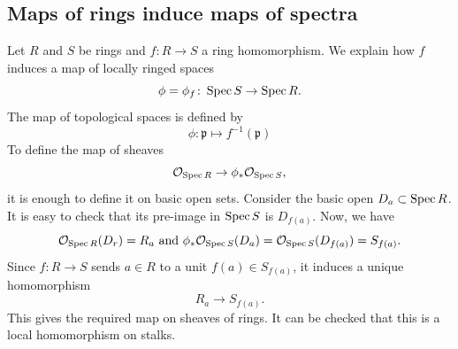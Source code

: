 \subsection{Maps of rings induce maps of spectra}
Let \(R\) and \(S\) be rings and \(f \colon R \to S\) a ring homomorphism.
We explain how \(f\) induces a map of locally ringed spaces
\[ \phi = \phi_{f} \colon \operatorname{Spec} S \to \operatorname{Spec} R.\] 
The map of topological spaces is defined by
\begin{equation}
 \phi \colon \mathfrak{p} \mapsto f^{-1}(\mathfrak{p})
\end{equation}
To define the map of sheaves
\[ \mathcal{O}_{\operatorname{Spec} R} \to \phi_{*} \mathcal{O}_{\operatorname{Spec} S},\]
it is enough to define it on basic open sets.
Consider the basic open \(D_a \subset \operatorname{Spec} R\).
It is easy to check that its pre-image in \(\operatorname{Spec} S\) is \(D_{f(a)}\).
Now, we have
\[ \mathcal{O}_{\operatorname{Spec} R} (D_{r}) = R_a \text{ and } \phi_{*} \mathcal{O}_{\operatorname{Spec} S} (D_a) =  \mathcal{O}_{\operatorname{Spec} S}(D_{f(a)}) = S_{f(a)}.\]
Since \(f \colon R \to S\) sends \(a \in R\) to a unit \(f(a) \in S_{f(a)}\), it induces a unique homomorphism
\[ R_a \to S_{f(a)}.\]
This gives the required map on sheaves of rings.
It can be checked that this is a local homomorphism on stalks.
